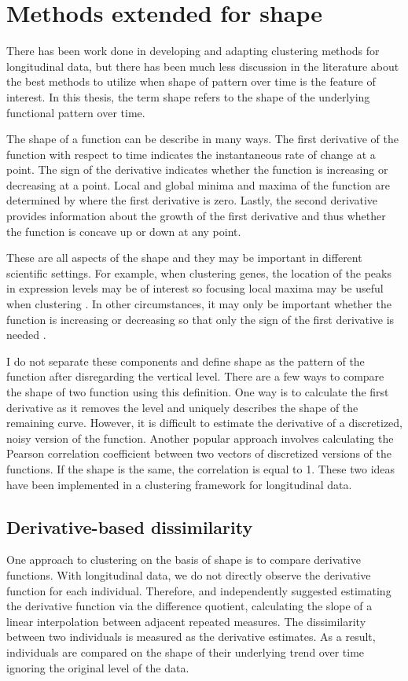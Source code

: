 \section{Methods extended for shape}
There has been work done in developing and adapting clustering methods for longitudinal data, but there has been much less discussion in the literature about the best methods to utilize when shape of pattern over time is the feature of interest. In this thesis, the term shape refers to the shape of the underlying functional pattern over time.

The shape of a function can be describe in many ways. The first derivative of the function with respect to time indicates the instantaneous rate of change at a point. The sign of the derivative indicates whether the function is increasing or decreasing at a point.  Local and global minima and maxima of the function are determined by where the first derivative is zero. Lastly, the second derivative provides information about the growth of the first derivative and thus whether the function is concave up or down at any point. 

These are all aspects of the shape and they may be important in different scientific settings. For example, when clustering genes, the location of the peaks in expression levels may be of interest so focusing local maxima may be useful when clustering \cite{luan2003}. In other circumstances, it may only be important whether the function is increasing or decreasing so that only the sign of the first derivative is needed \cite{phang2003}. 

I do not separate these components and define shape as the pattern of the function after disregarding the vertical level. There are a few ways to compare the shape of two function using this definition. One way is to calculate the first derivative as it removes the level and uniquely describes the shape of the remaining curve. However, it is difficult to estimate the derivative of a discretized, noisy version of the function. Another popular approach involves calculating the Pearson correlation coefficient between two vectors of discretized versions of the functions. If the shape is the same, the correlation is equal to 1. These two ideas have been implemented in a clustering framework for longitudinal data.


\subsection{Derivative-based dissimilarity}
One approach to clustering on the basis of shape is to compare derivative functions. With longitudinal data, we do not directly observe the derivative function for each individual. Therefore, \textcite{moller2003} and \textcite{d2000} independently suggested estimating the derivative function via the difference quotient, calculating the slope of a linear interpolation between adjacent repeated measures. The dissimilarity between two individuals is measured as the derivative estimates. As a result, individuals are compared on the shape of their underlying trend over time ignoring the original level of the data. 

